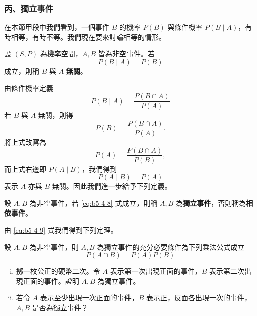 \subsubsection*{丙、獨立事件}\label{sec:b5-4-2-c}

在本節甲段中我們看到，一個事件 $B$ 的機率 $P(B)$ 與條件機率 $P(B\mid A)$，有時相等，有時不等。我們現在要來討論相等的情形。

\medskip
\begin{definition*}
設 $(S, P)$ 為機率空間，$A, B$ 皆為非空事件。若
\begin{equation}
P(B\mid A) = P(B) \tag{8}\label{eq:b5-4-8}
\end{equation}
成立，則稱 $B$ 與 $A$ \textbf{無關}。
\end{definition*}

由條件機率定義
\[
P(B\mid A) = \frac{P(B \cap A)}{P(A)}
\]
若 $B$ 與 $A$ 無關，則得
\begin{equation}
P(B) = \frac{P(B \cap A)}{P(A)}. \tag{9}\label{eq:b5-4-9}
\end{equation}
將上式改寫為
\[
P(A) = \frac{P(B \cap A)}{P(B)},
\]
而上式右邊即 $P(A\mid B)$，我們得到
\[
P(A\mid B) = P(A)
\]
表示 $A$ 亦與 $B$ 無關。因此我們進一步給予下列定義。

\medskip
\begin{definition*}
設 $A, B$ 為非空事件，若 \eqref{eq:b5-4-8} 式成立，則稱 $A, B$ 為\textbf{獨立事件}，否則稱為\textbf{相依事件}。
\end{definition*}

由 \eqref{eq:b5-4-9} 式我們得到下列定理。

\medskip
\begin{theorem}[乘法定理]\label{thm:b5-4-6}
設 $A, B$ 為非空事件，則 $A, B$ 為獨立事件的充分必要條件為下列乘法公式成立
\begin{equation}
P(A \cap B) = P(A)P(B) \label{eq:b5-4-10}\tag*{(10)\quad\#}
\end{equation}
\end{theorem}

\medskip
\begin{example}\label{ex:b5-4-13}
\begin{enumerate}[(i), leftmargin=2.5em, itemsep=0.3em]
  \item 擲一枚公正的硬幣二次。令 $A$ 表示第一次出現正面的事件，$B$ 表示第二次出現正面的事件。證明 $A, B$ 為獨立事件。
  \item 若令 $A$ 表示至少出現一次正面的事件，$B$ 表示正，反面各出現一次的事件，$A, B$ 是否為獨立事件？
\end{enumerate}
\end{example}
